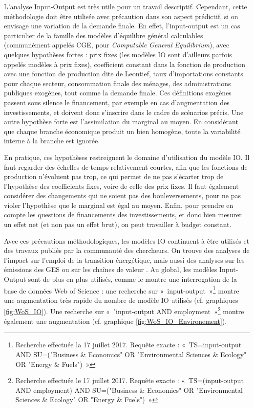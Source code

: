 L'analyse Input-Output est très utile pour un travail descriptif.
Cependant, cette méthodologie doit être utilisée avec précaution dans son aspect prédictif, si on envisage une variation de la demande finale. En effet, l’input-output est un cas particulier de la famille des modèles d'équilibre général calculables (communément appelés CGE, pour \textit{Computable General Equilibrium}), avec quelques hypothèses fortes : prix fixes (les modèles IO sont d’ailleurs parfois appelés modèles à prix fixes), coefficient constant dans la fonction de production avec une fonction de production dite de Leontief, taux d’importations constants pour chaque secteur, consommation finale des ménages, des administrations publiques exogènes, tout comme la demande finale. Ces définitions exogènes passent sous silence le financement, par exemple en cas d’augmentation des investissements, et doivent donc s'inscrire dans le cadre de scénarios précis. Une autre hypothèse forte est l'assimilation du marginal au moyen. En considérant que chaque branche économique produit un bien homogène, toute la variabilité interne à la branche est ignorée.

En pratique, ces hypothèses restreignent le domaine d’utilisation du modèle IO. Il faut regarder des échelles de temps relativement courtes, afin que les fonctions de production n’évoluent pas trop, ce qui permet de ne pas s’écarter trop de l’hypothèse des coefficients fixes, voire de celle des prix fixes. Il faut également considérer des changements qui ne soient pas des bouleversements, pour ne pas violer l’hypothèse que le marginal est égal au moyen.
Enfin, pour prendre en compte les questions de financements des investissements, et donc bien mesurer un effet net (et non pas un effet brut), on peut travailler à budget constant.

Avec ces précautions méthodologiques, les modèles IO continuent à être utilisés et des travaux publiés par la communauté des chercheurs. On trouve des analyses de l'impact sur l'emploi de la transition énergétique, mais aussi des analyses sur les émissions des GES ou sur les chaînes de valeur \citep{Timmer2014}.
Au global, les modèles Input-Output sont de plus en plus utilisés, comme le montre une interrogation de la base de données Web of Science : une recherche sur «~input-output~»\footnote{Recherche effectuée la 17 juillet 2017. Requête exacte : «~TS=input-output AND SU=("Business \& Economics" OR "Environmental Sciences \& Ecology" OR "Energy \& Fuels")~»} montre une augmentation très rapide du nombre de modèle IO utilisés (cf. graphiques \ref{fig:WoS_IO}). Une recherche sur «~"input-output AND employment~»\footnote{Recherche effectuée le 17 juillet 2017. Requête exacte : «~TS=(input-output AND employment) AND SU=("Business \& Economics" OR "Environmental Sciences \& Ecology" OR "Energy \& Fuels")~»} montre également une augmentation (cf. graphique \ref{fig:WoS_IO_Environement}). 

